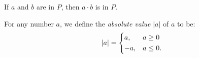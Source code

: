 \begin{theorem}
If $a$ and $b$ are in $P$, then $a \cdot b$ is in $P$.
\cite[p.~9]{spivak}
\end{theorem}

\begin{defn}
    For any number $a$, we define the \emph{absolute value}
    $|a|$ of $a$ to be:\cite[p.~11]{spivak}
    \begin{equation}
        |a| = \begin{dcases}
            a, &a \geq 0\\
            -a, & a \leq 0.
        \end{dcases}
    \end{equation}
\end{defn}
